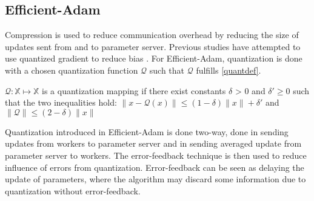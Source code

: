 \subsection{Efficient-Adam}
Compression is used to reduce communication overhead by reducing the size of updates sent from and to parameter server. Previous studies have attempted to use quantized gradient to reduce bias \cite{Chen2022Efficient,Chen2021Quantized}. For Efficient-Adam, quantization is done with a chosen quantization function $\mathcal{Q}$ such that $\mathcal{Q}$ fulfills \autoref{quantdef}.
\begin{definition}
  \label{quantdef}
  $\mathcal{Q}: \mathbb{X} \mapsto \mathbb{X}$ is a quantization mapping if there exist constants $\delta$ > 0 and $\delta' \geq 0$ such that the two inequalities hold: $\|x - \mathcal{Q}(x)\| \leq (1-\delta) \|x\| + \delta'$ and $\|\mathcal{Q} \| \leq (2-\delta)\|x\|$
\end{definition}

Quantization introduced in Efficient-Adam is done two-way, done in sending updates from workers to parameter server and in sending averaged update from parameter server to workers. The error-feedback technique is then used to reduce influence of errors from quantization. Error-feedback can be seen as delaying the update of parameters, where the algorithm may discard some information due to quantization without error-feedback.
